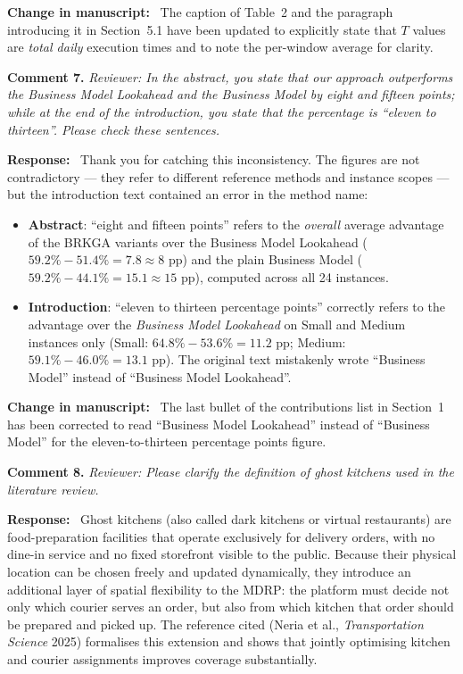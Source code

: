 \documentclass[12pt]{article}
\newcommand{\rev}[1]{\textcolor{revcolor}{\textit{Reviewer: #1}}}
\newcommand{\resp}{\noindent\textbf{Response:}\ }
\newcommand{\change}{\noindent\textbf{Change in manuscript:}\ }
\begin{document}
\change
The caption of Table~2 and the paragraph introducing it in
Section~5.1 have been updated to explicitly state that
$T$ values are \emph{total daily} execution times and to
note the per-window average for clarity.

\bigskip

\noindent\textbf{Comment 7.}
\rev{In the abstract, you state that our approach outperforms the
Business Model Lookahead and the Business Model by eight and fifteen
points; while at the end of the introduction, you state that the
percentage is ``eleven to thirteen''. Please check these sentences.}

\resp
Thank you for catching this inconsistency.
The figures are not contradictory — they refer to different
reference methods and instance scopes — but the introduction
text contained an error in the method name:

\begin{itemize}
  \item \textbf{Abstract}: ``eight and fifteen points'' refers to
  the \emph{overall} average advantage of the BRKGA variants over
  the Business Model Lookahead ($59.2\% - 51.4\% = 7.8 \approx 8$
  pp) and the plain Business Model ($59.2\% - 44.1\% = 15.1 \approx
  15$ pp), computed across all 24 instances.

  \item \textbf{Introduction}: ``eleven to thirteen percentage
  points'' correctly refers to the advantage over the
  \emph{Business Model Lookahead} on Small and Medium instances
  only (Small: $64.8\% - 53.6\% = 11.2$ pp;
  Medium: $59.1\% - 46.0\% = 13.1$ pp).
  The original text mistakenly wrote ``Business Model'' instead
  of ``Business Model Lookahead''.
\end{itemize}

\change
The last bullet of the contributions list in Section~1 has been
corrected to read ``Business Model Lookahead'' instead of
``Business Model'' for the eleven-to-thirteen percentage points
figure.

\bigskip

\noindent\textbf{Comment 8.}
\rev{Please clarify the definition of ghost kitchens used in the
literature review.}

\resp
Ghost kitchens (also called dark kitchens or virtual restaurants)
are food-preparation facilities that operate exclusively for
delivery orders, with no dine-in service and no fixed storefront
visible to the public.
Because their physical location can be chosen freely and updated
dynamically, they introduce an additional layer of spatial
flexibility to the MDRP: the platform must decide not only which
courier serves an order, but also from which kitchen that order
should be prepared and picked up.
The reference cited (Neria et al., \textit{Transportation Science}
2025) formalises this extension and shows that jointly optimising
kitchen and courier assignments improves coverage substantially.
\end{document}
